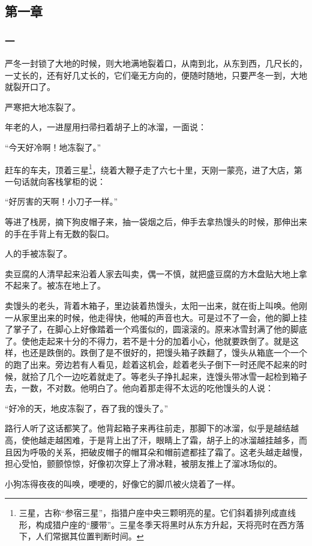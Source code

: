 \subsection{第一章}

\subsubsection*{一}
\par 严冬一封锁了大地的时候，则大地满地裂着口，从南到北，从东到西，几尺长的，一丈长的，还有好几丈长的，它们毫无方向的，便随时随地，只要严冬一到，大地就裂开口了。
\par 严寒把大地冻裂了。
\par 年老的人，一进屋用扫帚扫着胡子上的冰溜，一面说：
\par “今天好冷啊！地冻裂了。”
\par 赶车的车夫，顶着三星\footnote{三星，古称“参宿三星”，指猎户座中央三颗明亮的星。它们斜着排列成直线形，构成猎户座的“腰带”。三星冬季天将黑时从东方升起，天将亮时在西方落下，人们常据其位置判断时间。}，绕着大鞭子走了六七十里，天刚一蒙亮，进了大店，第一句话就向客栈掌柜的说：
\par “好厉害的天啊！小刀子一样。”
\par 等进了栈房，摘下狗皮帽子来，抽一袋烟之后，伸手去拿热馒头的时候，那伸出来的手在手背上有无数的裂口。
\par 人的手被冻裂了。
\par 卖豆腐的人清早起来沿着人家去叫卖，偶一不慎，就把盛豆腐的方木盘贴大地上拿不起来了。被冻在地上了。
\par 卖馒头的老头，背着木箱子，里边装着热馒头，太阳一出来，就在街上叫唤。他刚一从家里出来的时候，他走得快，他喊的声音也大。可是过不了一会，他的脚上挂了掌子了，在脚心上好像踏着一个鸡蛋似的，圆滚滚的。原来冰雪封满了他的脚底了。使他走起来十分的不得力，若不是十分的加着小心，他就要跌倒了。就是这样，也还是跌倒的。跌倒了是不很好的，把馒头箱子跌翻了，馒头从箱底一个一个的跑了出来。旁边若有人看见，趁着这机会，趁着老头子倒下一时还爬不起来的时候，就拾了几个一边吃着就走了。等老头子挣扎起来，连馒头带冰雪一起检到箱子去，一数，不对数。他明白了。他向着那走得不太远的吃他馒头的人说：
\par “好冷的天，地皮冻裂了，吞了我的馒头了。”
\par 路行人听了这话都笑了。他背起箱子来再往前走，那脚下的冰溜，似乎是越结越高，使他越走越困难，于是背上出了汗，眼睛上了霜，胡子上的冰溜越挂越多，而且因为呼吸的关系，把破皮帽子的帽耳朵和帽前遮都挂了霜了。这老头越走越慢，担心受怕，颤颤惊惊，好像初次穿上了滑冰鞋，被朋友推上了溜冰场似的。
\par 小狗冻得夜夜的叫唤，哽哽的，好像它的脚爪被火烧着了一样。
